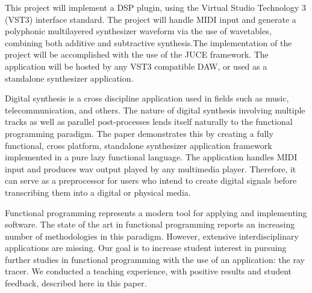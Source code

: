 \documentclass[10pt,a4paper]{altacv}
\begin{document}

\small{
	This project will implement a DSP plugin, using the Virtual Studio Technology 3 (VST3) interface standard. The project will handle MIDI input and generate a polyphonic multilayered synthesizer waveform via the use of wavetables, combining both additive and subtractive synthesis.The implementation of the project will be accomplished with the use of the JUCE framework. The application will be hosted by any VST3 compatible DAW, or used as a standalone synthesizer application.
}
\medskip

\divider

\small{Digital synthesis is a cross discipline application used in fields such as music, telecommunication, and others. The nature of digital synthesis involving multiple tracks as well as parallel post-processes lends itself naturally to the functional programming paradigm. The paper demonstrates this by creating a fully functional, cross platform, standalone synthesizer application framework implemented in a pure lazy functional language. The application handles MIDI input and produces wav output played by any multimedia player. Therefore, it can serve as a preprocessor for users who intend to create digital signals before transcribing them into a digital or physical media.}

\medskip

\divider

\small{
Functional programming represents a modern tool for applying and implementing software. The state
of the art in functional programming reports an increasing number of methodologies in this paradigm.
However, extensive interdisciplinary applications are missing. Our goal is to increase student interest
in pursuing further studies in functional programming with the use of an application: the ray tracer.
We conducted a teaching experience, with positive results and student feedback, described here in
this paper.
}

\clearpage
\end{document}
